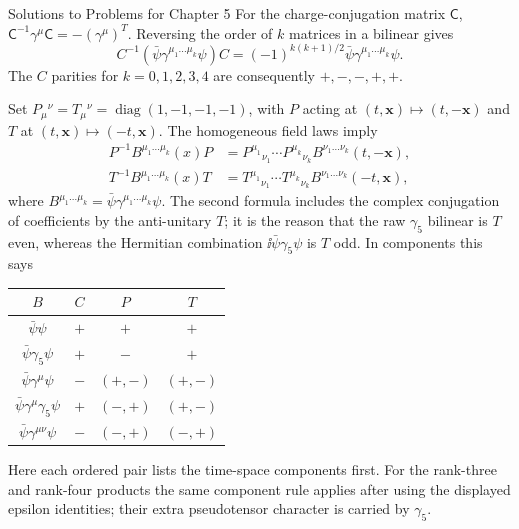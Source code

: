 \begin{bankssolutions}{Solutions to Problems for Chapter 5}
For the charge-conjugation matrix $\mathsf C$,
$\mathsf C^{-1}\gamma^\mu\mathsf C=-(\gamma^\mu)^T$. Reversing the order of
$k$ matrices in a bilinear gives
\begin{equation*}
 C^{-1}\!\left(\bar\psi\gamma^{\mu_1\ldots\mu_k}\psi\right)C
 =(-1)^{k(k+1)/2}\bar\psi\gamma^{\mu_1\ldots\mu_k}\psi.
\end{equation*}
The $C$ parities for $k=0,1,2,3,4$ are consequently
$+,-,-,+,+$.

Set $P_\mu{}^\nu=T_\mu{}^\nu=\operatorname{diag}(1,-1,-1,-1)$, with $P$
acting at $(t,\mathbf x)\mapsto(t,-\mathbf x)$ and $T$ at
$(t,\mathbf x)\mapsto(-t,\mathbf x)$. The homogeneous field laws imply
\begin{align*}
 P^{-1}B^{\mu_1\ldots\mu_k}(x)P
 &=P^{\mu_1}{}_{\nu_1}\cdots P^{\mu_k}{}_{\nu_k}
   B^{\nu_1\ldots\nu_k}(t,-\mathbf x),\\
 T^{-1}B^{\mu_1\ldots\mu_k}(x)T
 &=T^{\mu_1}{}_{\nu_1}\cdots T^{\mu_k}{}_{\nu_k}
   B^{\nu_1\ldots\nu_k}(-t,\mathbf x),
\end{align*}
where $B^{\mu_1\ldots\mu_k}=\bar\psi\gamma^{\mu_1\ldots\mu_k}\psi$.
The second formula includes the complex conjugation of coefficients by the
anti-unitary $T$; it is the reason that the raw $\gamma_5$ bilinear is $T$ even,
whereas the Hermitian combination $\ii\bar\psi\gamma_5\psi$ is $T$ odd.
In components this says
\begin{center}
\begin{tabular}{c|c|c|c}
 $B$ & $C$ & $P$ & $T$ \\ \hline
 $\bar\psi\psi$ & $+$ & $+$ & $+$ \\
 $\bar\psi\gamma_5\psi$ & $+$ & $-$ & $+$ \\
 $\bar\psi\gamma^\mu\psi$ & $-$ & $(+,-)$ & $(+,-)$ \\
 $\bar\psi\gamma^\mu\gamma_5\psi$ & $+$ & $(-,+)$ & $(+,-)$ \\
 $\bar\psi\gamma^{\mu\nu}\psi$ & $-$ & $(-,+)$ & $(-,+)$
\end{tabular}
\end{center}
Here each ordered pair lists the time-space components first. For the rank-three
and rank-four products the same component rule applies after using the displayed
epsilon identities; their extra pseudotensor character is carried by $\gamma_5$.


\end{bankssolutions}
